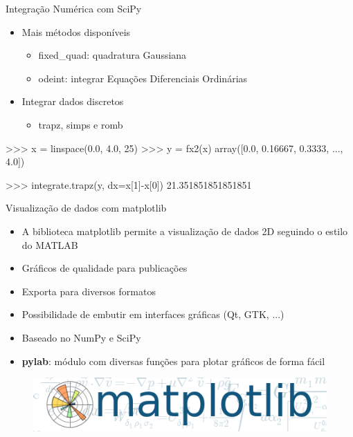 \documentclass[12pt,t,graphics]{beamer}
\begin{document}
\begin{frame}[t,fragile]{Integração Numérica com SciPy}
	\begin{itemize}
		\item Mais métodos disponíveis
		\begin{itemize}
			\item fixed\_quad: quadratura Gaussiana
			\item odeint: integrar Equações Diferenciais Ordinárias
		\end{itemize}
		\item Integrar dados discretos
		\begin{itemize}
			\item trapz, simps e romb
		\end{itemize}
	\end{itemize}
	\begin{python}
>>> x = linspace(0.0, 4.0, 25)
>>> y = fx2(x)
array([0.0, 0.16667, 0.3333, ..., 4.0])
	
>>> integrate.trapz(y, dx=x[1]-x[0])
21.351851851851851
	\end{python}
\end{frame}

\begin{frame}[t,fragile]{Visualização de dados com matplotlib}
	\begin{itemize}
		\item A biblioteca matplotlib permite a visualização de dados 2D seguindo o
		estilo do MATLAB
		\item Gráficos de qualidade para publicações
		\item Exporta para diversos formatos
		\item Possibilidade de embutir em interfaces gráficas (Qt, GTK, ...)
		\item Baseado no NumPy e SciPy
		\item \textbf{pylab}: módulo com diversas funções para plotar gráficos 
		de forma fácil
	\end{itemize}
	\begin{figure}
		\centering
		\includegraphics[scale=0.5]{img/matplotlib.png}
	\end{figure}
\end{frame}
\end{document}
